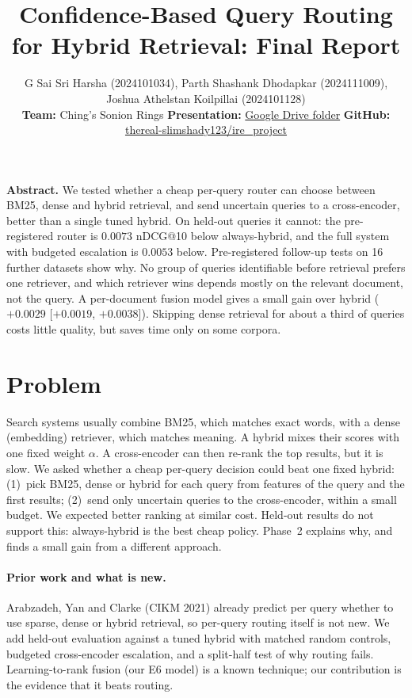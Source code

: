 \documentclass[10pt,twocolumn]{article}
\title{\vspace{-0.4in}Confidence-Based Query Routing for Hybrid Retrieval: Final Report}
\author{\normalsize
  G Sai Sri Harsha (2024101034), Parth Shashank Dhodapkar (2024111009), Joshua Athelstan Koilpillai (2024101128)\\
  \normalsize\textbf{Team:} Ching's Sonion Rings \quad
  \textbf{Presentation:} \href{https://drive.google.com/drive/folders/1VuHwiwowSJQMIVN0N5-4-laXq_mDwFmC?usp=sharing}{Google Drive folder} \quad
  \textbf{GitHub:} \href{https://github.com/thereal-slimshady123/ire_project}{thereal-slimshady123/ire\_project}%
}
\date{\vspace{-0.3in}}
\newcommand{\ci}[2]{[$#1$, $#2$]}
\begin{document}
\maketitle

\noindent\textbf{Abstract.} We tested whether a cheap per-query router can choose between BM25, dense and hybrid retrieval, and send uncertain queries to a cross-encoder, better than a single tuned hybrid. On held-out queries it cannot: the pre-registered router is $0.0073$ nDCG@10 below always-hybrid, and the full system with budgeted escalation is $0.0053$ below. Pre-registered follow-up tests on 16 further datasets show why. No group of queries identifiable before retrieval prefers one retriever, and which retriever wins depends mostly on the relevant document, not the query. A per-document fusion model gives a small gain over hybrid ($+0.0029$ \ci{+0.0019}{+0.0038}). Skipping dense retrieval for about a third of queries costs little quality, but saves time only on some corpora.

\section{Problem}

Search systems usually combine BM25, which matches exact words, with a dense (embedding) retriever, which matches meaning. A hybrid mixes their scores with one fixed weight $\alpha$. A cross-encoder can then re-rank the top results, but it is slow. We asked whether a cheap per-query decision could beat one fixed hybrid: (1)~pick BM25, dense or hybrid for each query from features of the query and the first results; (2)~send only uncertain queries to the cross-encoder, within a small budget. We expected better ranking at similar cost. Held-out results do not support this: always-hybrid is the best cheap policy. Phase~2 explains why, and finds a small gain from a different approach.

\paragraph{Prior work and what is new.} Arabzadeh, Yan and Clarke (CIKM 2021) already predict per query whether to use sparse, dense or hybrid retrieval, so per-query routing itself is not new. We add held-out evaluation against a tuned hybrid with matched random controls, budgeted cross-encoder escalation, and a split-half test of why routing fails. Learning-to-rank fusion (our E6 model) is a known technique; our contribution is the evidence that it beats routing.
\end{document}

